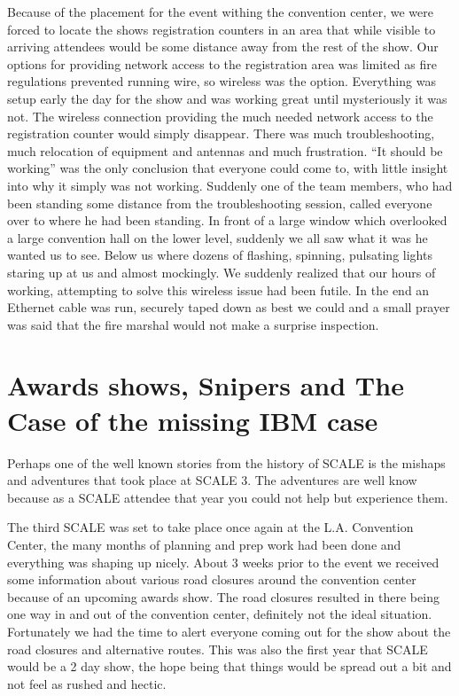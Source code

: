 Because of the placement for the event withing the convention center, we were
forced to locate the shows registration counters in an area that while visible
to arriving attendees would be some distance away from the rest of the show. 
Our options for providing network access to the registration area was limited as
fire regulations prevented running wire, so wireless was the option. Everything
was setup early the day for the show and was working great until mysteriously it
was not. The wireless connection providing the much needed network access to
the registration counter would simply disappear. There was much
troubleshooting, much relocation of equipment and antennas and much frustration.
``It should be working'' was the only conclusion that everyone could come to,
with little insight into why it simply was not working. Suddenly one of the team
members, who had been standing some distance from the troubleshooting session,
called everyone over to where he had been standing. In front of a large window
which overlooked a large convention hall on the lower level, suddenly we all saw
what it was he wanted us to see. Below us where dozens of flashing, spinning,
pulsating lights staring up at us and almost mockingly.
We suddenly realized that our hours of working, attempting to solve this
wireless issue had been futile. In the end an Ethernet cable was run, securely
taped down as best we could and a small prayer was said that the fire marshal
would not make a surprise inspection.

\section*{Awards shows, Snipers and The Case of the missing IBM case}

Perhaps one of the well known stories from the history of SCALE is the mishaps
and adventures that took place at SCALE 3. The adventures are well know because
as a SCALE attendee that year you could not help but experience them.

The third SCALE was set to take place once again at the L.A. Convention Center,
the many months of planning and prep work had been done and everything was
shaping up nicely. About 3 weeks prior to the event we received some
information about various road closures around the convention center because of
an upcoming awards show. The road closures resulted in there being one way in
and out of the convention center, definitely not the ideal situation. 
Fortunately we had the time to alert everyone coming out for the show about the
road closures and alternative routes. This was also the first year that SCALE
would be a 2 day show, the hope being that things would be spread out a bit and
not feel as rushed and hectic.

